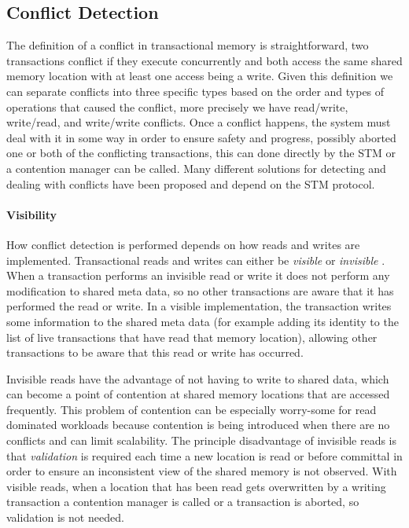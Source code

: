 \subsection{Conflict Detection}
The definition of a conflict in transactional memory is straightforward, two 
transactions conflict if they execute concurrently and both access the same 
shared memory location with at least one access being a write.
Given this definition we can separate conflicts into three specific types based
on the order and types of operations that caused the conflict, more precisely we have
read/write, write/read, and write/write conflicts.
Once a conflict happens, the system must deal with it in some way in order to ensure
safety and progress, possibly aborted one or both of the conflicting transactions,
this can done directly by the STM or a contention manager \cite{HLMS03} can be called.
Many different solutions for detecting and dealing with conflicts have been proposed and depend
on the STM protocol.

\paragraph{Visibility}
How conflict detection is performed depends on how reads and writes are implemented.
Transactional reads and writes can either be \emph{visible} or \emph{invisible} \cite{IR09}.
When a transaction performs an invisible read or write it does not perform any 
modification to shared meta data, so no other transactions are aware that it has performed the read or write.
In a visible implementation, the transaction writes some 
information to the shared meta data (for example adding its identity to the list 
of live transactions that have read that memory location), allowing other 
transactions to be aware that this read or write has occurred.

Invisible reads have the advantage of not having to write to shared data, 
which can become a point of contention at shared memory locations that are accessed frequently.
This problem of contention can be especially worry-some for read dominated 
workloads because contention is being introduced when there are no conflicts and can limit scalability.
The principle disadvantage of invisible reads is that  \emph{validation} is required
 each time a new location is read or before committal in order to ensure an inconsistent view of the shared memory is not observed.
With visible reads, when a location that has been read gets overwritten
 by a writing transaction a contention manager is called or a transaction is aborted, so validation is not needed.

